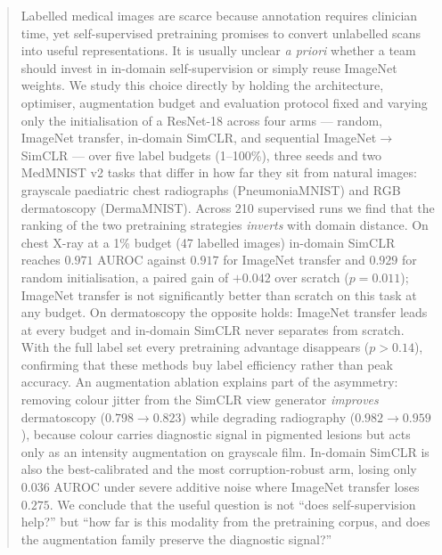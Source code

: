 \documentclass{article}
\begin{document}

\begin{abstract}
Labelled medical images are scarce because annotation requires clinician time, yet
self-supervised pretraining promises to convert unlabelled scans into useful
representations. It is usually unclear \emph{a priori} whether a team should invest in
in-domain self-supervision or simply reuse ImageNet weights. We study this choice
directly by holding the architecture, optimiser, augmentation budget and evaluation
protocol fixed and varying only the initialisation of a ResNet-18 across four arms ---
random, ImageNet transfer, in-domain SimCLR, and sequential ImageNet$\rightarrow$SimCLR
--- over five label budgets (1--100\%), three seeds and two MedMNIST v2 tasks that differ
in how far they sit from natural images: grayscale paediatric chest radiographs
(PneumoniaMNIST) and RGB dermatoscopy (DermaMNIST). Across 210 supervised runs we find
that the ranking of the two pretraining strategies \emph{inverts} with domain distance.
On chest X-ray at a 1\% budget (47 labelled images) in-domain SimCLR reaches
$0.971$ AUROC against $0.917$ for ImageNet transfer and $0.929$ for random
initialisation, a paired gain of $+0.042$ over scratch ($p=0.011$); ImageNet transfer is
not significantly better than scratch on this task at any budget. On dermatoscopy the
opposite holds: ImageNet transfer leads at every budget and in-domain SimCLR never
separates from scratch. With the full label set every pretraining advantage disappears
($p>0.14$), confirming that these methods buy label efficiency rather than peak accuracy.
An augmentation ablation explains part of the asymmetry: removing colour jitter from the
SimCLR view generator \emph{improves} dermatoscopy ($0.798\rightarrow0.823$) while
degrading radiography ($0.982\rightarrow0.959$), because colour carries diagnostic signal
in pigmented lesions but acts only as an intensity augmentation on grayscale film.
In-domain SimCLR is also the best-calibrated and the most corruption-robust arm, losing
only $0.036$ AUROC under severe additive noise where ImageNet transfer loses $0.275$.
We conclude that the useful question is not ``does self-supervision help?'' but ``how far
is this modality from the pretraining corpus, and does the augmentation family preserve
the diagnostic signal?''
\end{abstract}
\end{document}
